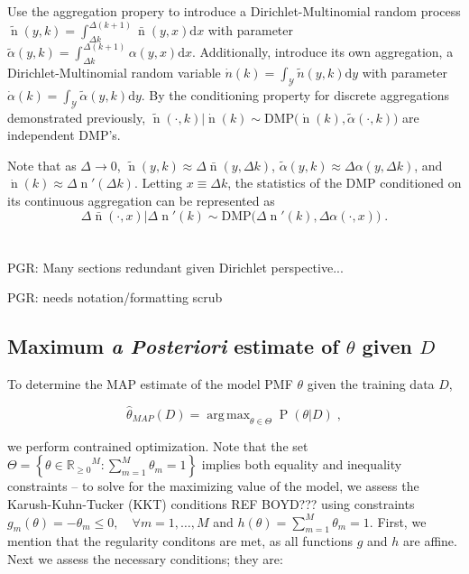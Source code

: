 \documentclass[12pt]{report}
\DeclareMathOperator*{\argmax}{arg\,max}
\DeclareMathOperator{\nrm}{\mathrm{n}}
\DeclareMathOperator{\Prm}{\mathrm{P}}
\DeclareMathOperator{\Ycal}{\mathcal{Y}}
\begin{document}
Use the aggregation propery to introduce a Dirichlet-Multinomial random process $\tilde{\nrm}(y,k) = \int_{\Delta k}^{\Delta (k+1)} \bar{\nrm}(y,x) \mathrm{d}x$ with parameter $\tilde{\alpha}(y,k) = \int_{\Delta k}^{\Delta (k+1)} \alpha(y,x) \mathrm{d}x$. Additionally, introduce its own aggregation, a Dirichlet-Multinomial random variable $\dot{n}(k) = \int_{\Ycal} \tilde{n}(y,k) \mathrm{d}y$ with parameter $\dot{\alpha}(k) = \int_{\Ycal} \tilde{\alpha}(y,k) \mathrm{d}y$. By the conditioning property for discrete aggregations demonstrated previously, $\tilde{\nrm}(\cdot,k) | \dot{\nrm}(k) \sim \mathrm{DMP}\big( \dot{\nrm}(k),\tilde{\alpha}(\cdot,k) \big)$ are independent DMP's.

Note that as $\Delta \to 0$, $\tilde{\nrm}(y,k) \approx \Delta \bar{\nrm}(y,\Delta k)$, $\tilde{\alpha}(y,k) \approx \Delta \alpha(y,\Delta k)$, and $\dot{\nrm}(k) \approx \Delta \nrm'(\Delta k)$. Letting $x \equiv \Delta k$, the statistics of the DMP conditioned on its continuous aggregation can be represented as
\begin{equation}
\Delta \bar{\nrm}(\cdot,x) | \Delta \nrm'(k) \sim \mathrm{DMP}\big( \Delta \nrm'(k), \Delta \alpha(\cdot,x) \big) \;.
\end{equation}







\chapter{}


PGR: Many sections redundant given Dirichlet perspective...

PGR: needs notation/formatting scrub






\section{Maximum \emph{a Posteriori} estimate of $\theta$ given $D$} \label{app:MAP_theta}

To determine the MAP estimate of the model PMF $\theta$ given the training data $D$, 

\begin{equation}
\hat{\theta}_{MAP}(D) = \argmax_{\theta \in \Theta} \Prm(\theta | D) \;,
\end{equation}

we perform contrained optimization. Note that the set $\Theta = \left\{ \theta \in {\mathbb{R}_{\geq 0}}^{M}: \sum_{m=1}^{M} \theta_m = 1 \right\}$ implies both equality and inequality constraints -- to solve for the maximizing value of the model, we assess the Karush-Kuhn-Tucker (KKT) conditions REF BOYD??? using constraints $g_m(\theta) = -\theta_m \leq 0, \quad \forall m = 1,\ldots,M$ and $h(\theta) = \sum_{m=1}^M \theta_m = 1$. First, we mention that the regularity conditons are met, as all functions $g$ and $h$ are affine. Next we assess the necessary conditions; they are:
\end{document}
